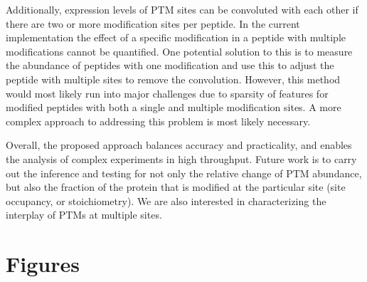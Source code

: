 \documentclass[mcp]{article}
\numberwithin{table}{section}
\begin{document}
Additionally, expression levels of PTM sites can be convoluted with each other if there are two or more modification sites per peptide. In the current implementation the effect of a specific modification in a peptide with multiple modifications cannot be quantified. One potential solution to this is to measure the abundance of peptides with one modification and use this to adjust the peptide with multiple sites to remove the convolution. However, this method would most likely run into major challenges due to sparsity of features for modified peptides with both a single and multiple modification sites. A more complex approach to addressing this problem is most likely necessary.

Overall, the proposed approach balances accuracy and practicality, and enables the analysis of complex experiments in high throughput. Future work is to carry out the inference and testing for not only the relative change of PTM abundance, but also the fraction of the protein that is modified at the particular site (site occupancy, or stoichiometry). We are also interested in characterizing the interplay of PTMs at multiple sites. 

\newpage
\printbibliography


\newpage
\section{Figures}
\end{document}
